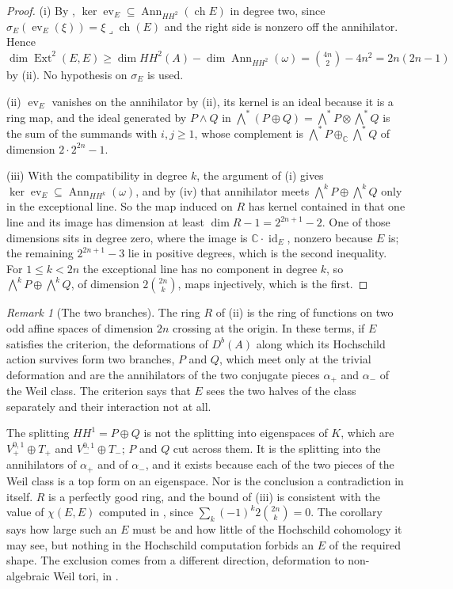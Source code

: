 \documentclass[11pt,reqno]{amsart}
\theoremstyle{plain}
\theoremstyle{definition}
\theoremstyle{remark}
\newtheorem{remark}[theorem]{Remark}
\newcommand{\CC}{\mathbb{C}}
\DeclareMathOperator{\ch}{ch}
\DeclareMathOperator{\Ext}{Ext}
\DeclareMathOperator{\id}{id}
\DeclareMathOperator{\Ann}{Ann}
\begin{document}
\begin{proof}
(i) By , $\ker\operatorname{ev}_{E}\subseteq\Ann_{HH^{2}}(\ch E)$
in degree two, since $\sigma_{E}(\operatorname{ev}_{E}(\xi))=\xi\lrcorner\ch(E)$
and the right side is nonzero off the annihilator. Hence
$\dim\Ext^{2}(E,E)\ge\dim HH^{2}(A)-\dim\Ann_{HH^{2}}(\omega)
=\binom{4n}{2}-4n^{2}=2n(2n-1)$ by (ii). No hypothesis
on $\sigma_{E}$ is used.

(ii) $\operatorname{ev}_{E}$ vanishes on the annihilator by
(ii), its kernel is an ideal because it is a ring map, and
the ideal generated by $P\wedge Q$ in $\bigwedge^{*}(P\oplus Q)
=\bigwedge^{*}P\otimes\bigwedge^{*}Q$ is the sum of the summands with
$i,j\ge1$, whose complement is $\bigwedge^{*}P\oplus_{\CC}\bigwedge^{*}Q$ of
dimension $2\cdot2^{2n}-1$.

(iii) With the compatibility in degree $k$, the argument of (i) gives
$\ker\operatorname{ev}_{E}\subseteq\Ann_{HH^{k}}(\omega)$, and by
(iv) that annihilator meets $\bigwedge^{k}P\oplus
\bigwedge^{k}Q$ only in the exceptional line. So the map induced on $R$ has
kernel contained in that one line and its image has dimension at least
$\dim R-1=2^{2n+1}-2$. One of those dimensions sits in degree zero, where the
image is $\CC\cdot\id_{E}$, nonzero because $E$ is; the remaining
$2^{2n+1}-3$ lie in positive degrees, which is the second inequality. For
$1\le k<2n$ the exceptional line has no component in degree $k$, so
$\bigwedge^{k}P\oplus\bigwedge^{k}Q$, of dimension $2\binom{2n}{k}$, maps
injectively, which is the first.
\end{proof}

\begin{remark}[The two branches]\label{rem:twobranches}
The ring $R$ of (ii) is the ring of functions on two odd
affine spaces of dimension $2n$ crossing at the origin. In these terms, if $E$
satisfies the criterion, the deformations of $D^{b}(A)$ along which its
Hochschild action survives form two branches, $P$ and $Q$, which meet only at
the trivial deformation and are the annihilators of the two conjugate pieces
$\alpha_{+}$ and $\alpha_{-}$ of the Weil class. The criterion says that $E$
sees the two halves of the class separately and their interaction not at all.

The splitting $HH^{1}=P\oplus Q$ is not the splitting into eigenspaces of
$K$, which are $V_{+}^{0,1}\oplus T_{+}$ and $V_{-}^{0,1}\oplus T_{-}$; $P$
and $Q$ cut across them. It is the splitting into the annihilators of
$\alpha_{+}$ and of $\alpha_{-}$, and it exists because each of the two
pieces of the Weil class is a top form on an eigenspace. Nor is the
conclusion a contradiction in itself. $R$ is a perfectly good ring, and the
bound of (iii) is consistent with the value of $\chi(E,E)$ computed in
\cite[Proposition~9.11]{paperI}, since $\sum_{k}(-1)^{k}2\binom{2n}{k}=0$. The
corollary says how large such an $E$ must be and how little of the Hochschild
cohomology it may see, but nothing in the Hochschild computation forbids an
$E$ of the required shape. The exclusion comes from a different direction,
deformation to non-algebraic Weil tori, in .
\end{remark}
\end{document}
